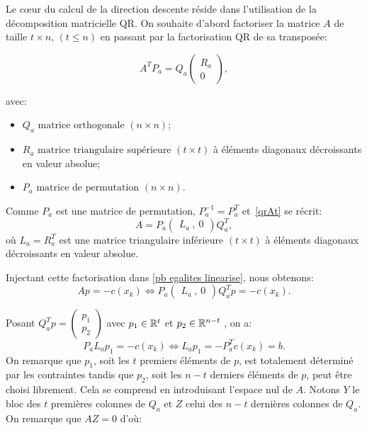 Le c\oe ur du calcul de la direction descente réside dans l'utilisation de la décomposition matricielle QR.
On souhaite d'abord factoriser la matrice $A$ de taille $t \times n$, $(t\leq n)$ en passant par la factorisation QR de sa transposée:

\begin{equation} \label{qrAt}
A^{T}P_{a}=Q_{a}
\begin{pmatrix}
R_{a} \\
0
\end{pmatrix},
\end{equation}

avec: 
\begin{itemize}
\item
$Q_{a}\text{ matrice orthogonale } (n\times n)$;
\item
$ R_{a} \text{ matrice triangulaire supérieure } (t \times t)$ à éléments diagonaux décroissants en valeur absolue;
\item
$P_{a} \text{ matrice de permutation } (n\times n)$.
\end{itemize}


Comme $P_{a}$ est une matrice de permutation, $P_a^{-1}=P_a^T$ et~\eqref{qrAt} se récrit:
\begin{equation}\label{lqA}
A = P_{a}
\begin{pmatrix}
L_{a}\ ,\ 0
\end{pmatrix}
Q_{a}^{T},
\end{equation}
où $L_{a}=R_{a}^{T}$ est une matrice triangulaire inférieure $(t \times t)$ à éléments diagonaux décroissants en valeur absolue.

Injectant cette factorisation dans \eqref{pb egalites linearise}, nous obtenons: 
\[
Ap = -c(x_{k}) \Longleftrightarrow P_{a}\begin{pmatrix}
L_{a} \ , \ 0
\end{pmatrix}
Q_{a}^{T}p = -c(x_{k}).
\]

Posant $Q_{a}^{T}p = \begin{pmatrix}
p_{1} \\ p_{2}
\end{pmatrix}$ avec $p_{1} \in \mathbb{R}^{t}$ et $p_{2} \in \mathbb{R}^{n-t}$ , on a:
\[
P_{a}L_{a}p_{1} = -c(x_{k}) \Longleftrightarrow L_{a}p_{1} = -P_{a}^{T}c(x_{k}) = b.
\]
On remarque que $p_{1}$, soit les $t$ premiers éléments de $p$, est totalement déterminé par les contraintes tandis que $p_{2}$, soit les $n-t$ derniers éléments de $p$, peut être choisi librement. 
Cela se comprend en introduisant l'espace nul de $A$. Notons $Y$ le bloc des $t$ premières colonnes de $Q_{a}$ et $Z$ celui des $n-t$ dernières colonnes de $Q_{a}$. On remarque que $AZ=0$ d'où:

